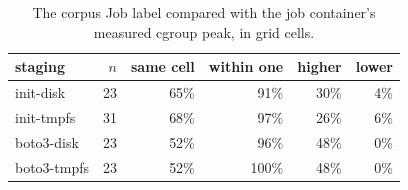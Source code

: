 \begin{table}[tbp]
\centering\small
\caption{The corpus Job label compared with the job container's measured cgroup peak, in
grid cells.}
\label{tab:cells}
\begin{tabular}{@{}lrrrrr@{}}
\toprule
staging & $n$ & same cell & within one & higher & lower \\
\midrule
init-disk   & 23 & 65\% &  91\% & 30\% & 4\% \\
init-tmpfs  & 31 & 68\% &  97\% & 26\% & 6\% \\
boto3-disk  & 23 & 52\% &  96\% & 48\% & 0\% \\
boto3-tmpfs & 23 & 52\% & 100\% & 48\% & 0\% \\
\bottomrule
\end{tabular}
\end{table}

